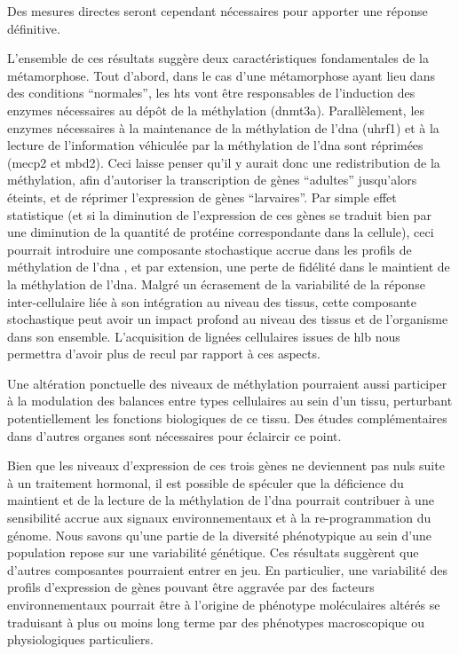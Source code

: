 \documentclass[../main.tex]{subfiles}
\begin{document}
	Des mesures directes seront cependant nécessaires pour apporter une réponse définitive.
	\par
	L'ensemble de ces résultats suggère deux caractéristiques fondamentales de la métamorphose.
	Tout d'abord, dans le cas d'une métamorphose ayant lieu dans des conditions ``normales'', les \glspl{ht} vont être responsables de l'induction des enzymes nécessaires au dépôt de la méthylation (\gls{dnmt3a}).
	Parallèlement, les enzymes nécessaires à la maintenance de la méthylation de l'\gls{dna} (\gls{uhrf1}) et à la lecture de l'information véhiculée par la méthylation de l'\gls{dna} sont réprimées (\gls{mecp2} et \gls{mbd}2).
	Ceci laisse penser qu'il y aurait donc une redistribution de la méthylation, afin d’autoriser la transcription de gènes ``adultes'' jusqu'alors éteints, et de réprimer l'expression de gènes ``larvaires''.
	Par simple effet statistique (et si la diminution de l'expression de ces gènes se traduit bien par une diminution de la quantité de protéine correspondante dans la cellule), ceci pourrait introduire une composante stochastique accrue dans les profils de méthylation de l'\gls{dna} \citep{Xie2011,Landan2012}, et par extension, une perte de fidélité dans le maintient de la méthylation de l'\gls{dna}.
	Malgré un écrasement de la variabilité de la réponse inter-cellulaire liée à son intégration au niveau des tissus, cette composante stochastique peut avoir un impact profond au niveau des tissus et de l'organisme dans son ensemble.
	L'acquisition de lignées cellulaires issues de \gls{hlb} \citep{Sinzelle2012} nous permettra d'avoir plus de recul par rapport à ces aspects.
	\par
	Une altération ponctuelle des niveaux de méthylation pourraient aussi participer à la modulation des balances entre types cellulaires au sein d'un tissu, perturbant potentiellement les fonctions biologiques de ce tissu.
	Des études complémentaires dans d'autres organes sont nécessaires pour éclaircir ce point.
	\par
	Bien que les niveaux d'expression de ces trois gènes ne deviennent pas nuls suite à un traitement hormonal, il est possible de spéculer que la déficience du maintient et de la lecture de la méthylation de l'\gls{dna} pourrait contribuer à une sensibilité accrue aux signaux environnementaux et à la re-programmation du génome.
	Nous savons qu'une partie de la diversité phénotypique au sein d'une population repose sur une variabilité génétique.
	Ces résultats suggèrent que d'autres composantes pourraient entrer en jeu.
	En particulier, une variabilité des profils d’expression de gènes pouvant être aggravée par des facteurs environnementaux pourrait être à l'origine de phénotype moléculaires altérés se traduisant à plus ou moins long terme par des phénotypes macroscopique ou physiologiques particuliers.
\end{document}
